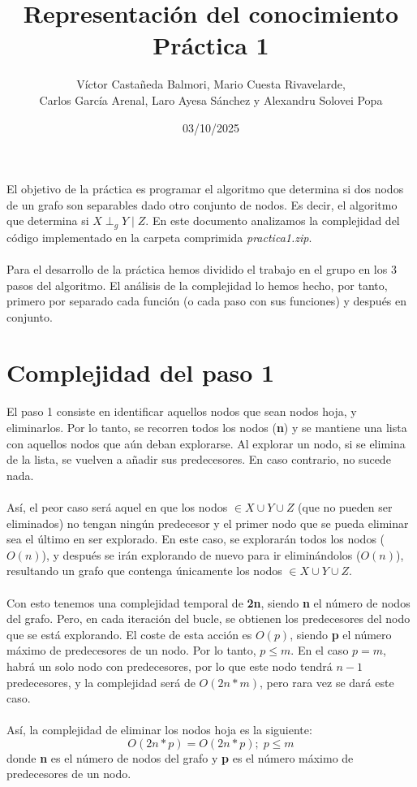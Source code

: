 \documentclass[a4paper,12pt]{article}
\title{Representación del conocimiento \\ Práctica 1}
\author{Víctor Castañeda Balmori, Mario Cuesta Rivavelarde, \\
Carlos García Arenal, Laro Ayesa Sánchez y Alexandru Solovei Popa}
\date{03/10/2025}
\begin{document}
\maketitle
\thispagestyle{fancy}
El objetivo de la práctica es programar el algoritmo que determina si dos nodos de un grafo son separables dado otro conjunto de nodos. Es decir, el algoritmo que determina si $X \perp _g Y \mid Z$. En este documento analizamos la complejidad del código implementado en la carpeta comprimida \textit{practica1.zip}. \\ \\
Para el desarrollo de la práctica hemos dividido el trabajo en el grupo en los 3 pasos del algoritmo. El análisis de la complejidad lo hemos hecho, por tanto, primero por separado cada función (o cada paso con sus funciones) y después en conjunto.

\section{Complejidad del paso 1}

El paso 1 consiste en identificar aquellos nodos que sean nodos hoja, y eliminarlos. Por lo tanto, se recorren todos los nodos (\textbf{n}) y se mantiene una lista con aquellos nodos que aún deban explorarse. Al explorar un nodo, si se elimina de la lista, se vuelven a añadir sus predecesores. En caso contrario, no sucede nada. \\ \\
Así, el peor caso será aquel en que los nodos $\in X \cup Y \cup Z$ (que no pueden ser eliminados) no tengan ningún predecesor y el primer nodo que se pueda eliminar sea el último en ser explorado. En este caso, se explorarán todos los nodos ($O(n)$), y después se irán explorando de nuevo para ir eliminándolos ($O(n)$), resultando un grafo que contenga únicamente los nodos $\in X \cup Y \cup Z$. \\ \\
Con esto tenemos una complejidad temporal de \textbf{2n}, siendo \textbf{n} el número de nodos del grafo. Pero, en cada iteración del bucle, se obtienen los predecesores del nodo que se está explorando. El coste de esta acción es $O(p)$, siendo \textbf{p} el número máximo de predecesores de un nodo. Por lo tanto, $p \le m$. En el caso $p = m$, habrá un solo nodo con predecesores, por lo que este nodo tendrá $n - 1$ predecesores, y la complejidad será de $O(2n*m)$, pero rara vez se dará este caso. \\ \\
Así, la complejidad de eliminar los nodos hoja es la siguiente:
$$O(2n*p) = O(2n*p); \; p \le m$$
donde \textbf{n} es el número de nodos del grafo y \textbf{p} es el número máximo de predecesores de un nodo.
\end{document}
